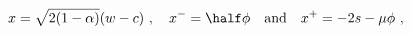 \begin{equation*}
  x = \sqrt{2(1-\alpha)} (w - c)~, \quad x^- = \half\phi
  \quad\text{and}\quad x^+ = -2s - \mu \phi~,
\end{equation*}

